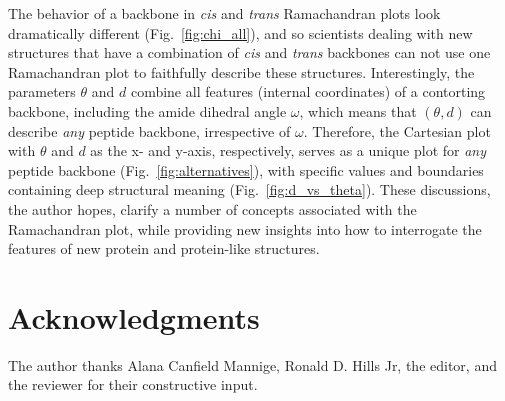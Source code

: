 \documentclass[fleqn,10pt,lineno]{wlpeerj} %
\newcommand{\n}[1]{{\color{black}#1}} %
\newcommand{\Fig}[1]{Fig.~\ref{#1}}
\newcommand{\cis}{{\em{cis}}\xspace}
\newcommand{\trans}{{\em{trans}}\xspace}
\begin{document}
The behavior of a backbone in \cis and \trans Ramachandran plots look dramatically different (\Fig{fig:chi_all}), and so scientists dealing with new structures \n{that have} a combination of \cis and \trans backbones can not use one Ramachandran plot to faithfully describe these structures. Interestingly, the parameters $\theta$ and $d$ combine all features (internal coordinates) of a contorting backbone, including the amide dihedral angle $\omega$, which means that $(\theta,d)$ can describe {\em any} peptide backbone, irrespective of $\omega$. Therefore, the Cartesian plot with $\theta$ and $d$ as the x- and y-axis, respectively, serves as a unique plot for {\em any} peptide backbone (\Fig{fig:alternatives}), with specific values and boundaries containing deep structural meaning (\Fig{fig:d_vs_theta}). These discussions, the author hopes, clarify a number of concepts associated with the Ramachandran plot, while providing new insights into how to interrogate the features of new protein and protein-like structures.

\section*{Acknowledgments}

\n{The author thanks Alana Canfield Mannige, Ronald D. Hills Jr, the editor, and the reviewer for their constructive input.}
\end{document}
